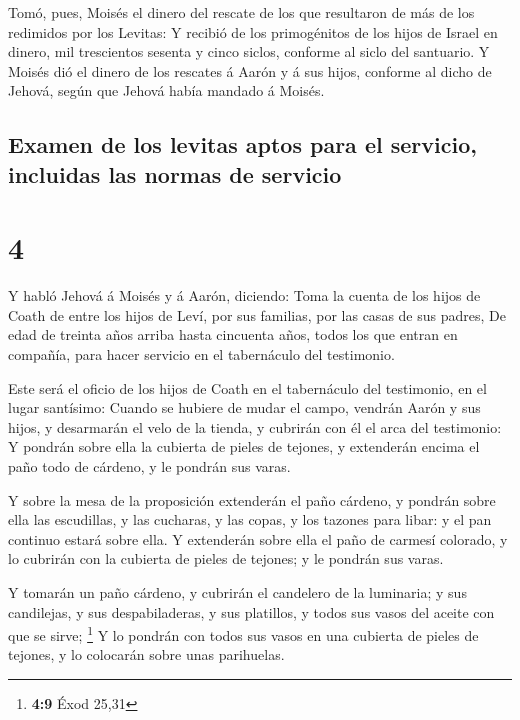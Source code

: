  Tomó, pues, Moisés el dinero del rescate de los que
resultaron de más de los redimidos por los Levitas:  Y
recibió de los primogénitos de los hijos de Israel en dinero, mil
trescientos sesenta y cinco siclos, conforme al siclo del santuario.
 Y Moisés dió el dinero de los rescates á Aarón y á sus
hijos, conforme al dicho de Jehová, según que Jehová había mandado á
Moisés.

\hypertarget{examen-de-los-levitas-aptos-para-el-servicio-incluidas-las-normas-de-servicio}{%
\subsection{Examen de los levitas aptos para el servicio, incluidas las
normas de
servicio}\label{examen-de-los-levitas-aptos-para-el-servicio-incluidas-las-normas-de-servicio}}

\hypertarget{section-3}{%
\section{4}\label{section-3}}

 Y habló Jehová á Moisés y á Aarón, diciendo: 
Toma la cuenta de los hijos de Coath de entre los hijos de Leví, por sus
familias, por las casas de sus padres,  De edad de treinta
años arriba hasta cincuenta años, todos los que entran en compañía, para
hacer servicio en el tabernáculo del testimonio.

 Este será el oficio de los hijos de Coath en el tabernáculo
del testimonio, en el lugar santísimo:  Cuando se hubiere de
mudar el campo, vendrán Aarón y sus hijos, y desarmarán el velo de la
tienda, y cubrirán con él el arca del testimonio:  Y pondrán
sobre ella la cubierta de pieles de tejones, y extenderán encima el paño
todo de cárdeno, y le pondrán sus varas.

 Y sobre la mesa de la proposición extenderán el paño
cárdeno, y pondrán sobre ella las escudillas, y las cucharas, y las
copas, y los tazones para libar: y el pan continuo estará sobre ella.
 Y extenderán sobre ella el paño de carmesí colorado, y lo
cubrirán con la cubierta de pieles de tejones; y le pondrán sus varas.

 Y tomarán un paño cárdeno, y cubrirán el candelero de la
luminaria; y sus candilejas, y sus despabiladeras, y sus platillos, y
todos sus vasos del aceite con que se sirve; \footnote{\textbf{4:9} Éxod
  25,31}  Y lo pondrán con todos sus vasos en una cubierta
de pieles de tejones, y lo colocarán sobre unas parihuelas.

